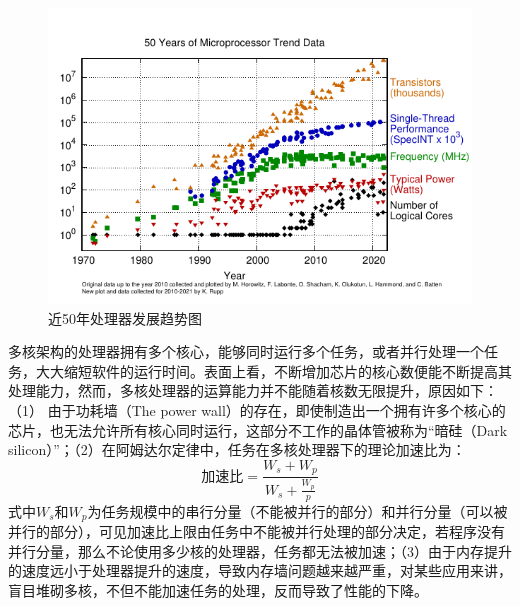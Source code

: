 \begin{figure}[htb]
    \centering
    \includegraphics[width=\textwidth]{figs/50-years-processor-trend.pdf}
    \caption{近50年处理器发展趋势图}
    \label{50yrs_processor_trend}
\end{figure}

多核架构的处理器拥有多个核心，能够同时运行多个任务，或者并行处理一个任务，大大缩短软件的运行时间。表面上看，不断增加芯片的核心数便能不断提高其处理能力，然而，多核处理器的运算能力并不能随着核数无限提升，原因如下：（1） 由于功耗墙（The power wall）的存在，即使制造出一个拥有许多个核心的芯片，也无法允许所有核心同时运行\cite{dark_silicon}，这部分不工作的晶体管被称为“暗硅（Dark silicon）”；（2）在阿姆达尔定律中\cite{amdahl_law}，任务在多核处理器下的理论加速比为：
\begin{equation}
    \label{amdahl_law}
    \text{加速比} = \frac{W_s+W_p}{W_s+ \frac{W_p}{p}}
\end{equation}
式中$W_s$和$W_p$为任务规模中的串行分量（不能被并行的部分）和并行分量（可以被并行的部分），可见加速比上限由任务中不能被并行处理的部分决定，若程序没有并行分量，那么不论使用多少核的处理器，任务都无法被加速；（3）由于内存提升的速度远小于处理器提升的速度，导致内存墙问题越来越严重，对某些应用来讲，盲目堆砌多核，不但不能加速任务的处理，反而导致了性能的下降\cite{multicore_bad}。

